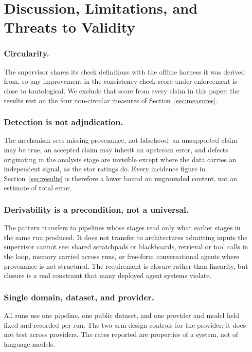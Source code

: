 \documentclass[runningheads]{llncs}
\begin{document}
\section{Discussion, Limitations, and Threats to Validity}
\label{sec:discussion}

\subsubsection{Circularity.}
The supervisor shares its check definitions with the offline harness it was
derived from, so any improvement in the consistency-check score under enforcement
is close to tautological. We exclude that score from every claim in this paper;
the results rest on the four non-circular measures of
Section~\ref{sec:measures}.

\subsubsection{Detection is not adjudication.}
The mechanism sees missing provenance, not falsehood: an unsupported claim may be
true, an accepted claim may inherit an upstream error, and defects originating in
the analysis stage are invisible except where the data carries an independent
signal, as the star ratings do. Every incidence figure in
Section~\ref{sec:results} is therefore a lower bound on ungrounded content, not
an estimate of total error.

\subsubsection{Derivability is a precondition, not a universal.}
The pattern transfers to pipelines whose stages read only what earlier stages in
the same run produced. It does not transfer to architectures admitting inputs the
supervisor cannot see: shared scratchpads or blackboards, retrieval or tool calls
in the loop, memory carried across runs, or free-form conversational agents where
provenance is not structural. The requirement is closure rather than linearity,
but closure is a real constraint that many deployed agent systems violate.

\subsubsection{Single domain, dataset, and provider.}
All runs use one pipeline, one public dataset, and one provider and model held
fixed and recorded per run. The two-arm design controls for the provider; it does
not test across providers. The rates reported are properties of a system, not of
language models.
\end{document}
